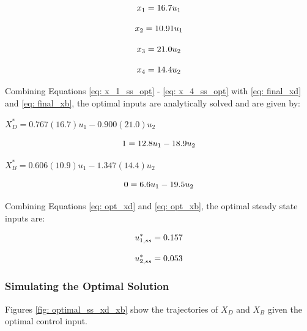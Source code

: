 {
\begin{equation}
    \centering
    x_1 = 16.7u_1
    \label{eq: x_1_ss_opt}
\end{equation}

\begin{equation}
    \centering
    x_2 = 10.91u_1
\end{equation}

\begin{equation}
    \centering
    x_3 = 21.0u_2
\end{equation}

\begin{equation}
    \centering
    x_4 = 14.4u_2
    \label{eq: x_4_ss_opt}
\end{equation}
}

Combining Equations \ref{eq: x_1_ss_opt} - \ref{eq: x_4_ss_opt} with \ref{eq: final_xd} and \ref{eq: final_xb}, the optimal inputs are analytically solved and are given by: \\

{
\centering
$X_D^* = 0.767(16.7)u_1 - 0.900(21.0)u_2$

\begin{equation}
    \centering
    1 = 12.8u_1 - 18.9u_2
    \label{eq: opt_xd}
\end{equation}
}

{
\centering
$X_B^* = 0.606(10.9)u_1 - 1.347(14.4)u_2$

\begin{equation}
    \centering
    0 = 6.6u_1 - 19.5u_2
    \label{eq: opt_xb}
\end{equation}
}

Combining Equations \ref{eq: opt_xd} and \ref{eq: opt_xb}, the optimal steady state inputs are: \\

{
\begin{equation}
    \centering
    u_{1, ss}^* = 0.157
\end{equation}

\begin{equation}
    \centering
    u_{2, ss}^* = 0.053
\end{equation}
}

\subsubsection{Simulating the Optimal Solution}
Figures \ref{fig: optimal_ss_xd_xb} show the trajectories of $X_D$ and $X_B$ given the optimal control input.

